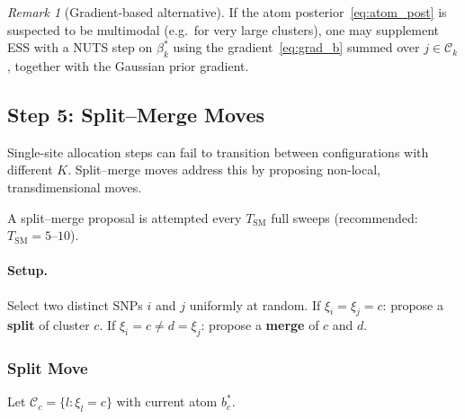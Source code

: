 \documentclass[12pt, a4paper]{article}
\theoremstyle{remark}
\newtheorem{remark}{Remark}
\begin{document}
\begin{remark}[Gradient-based alternative]
If the atom posterior~\eqref{eq:atom_post} is suspected to be
multimodal (e.g.\ for very large clusters), one may supplement ESS
with a NUTS step on $\beta_k^*$ using the gradient~\eqref{eq:grad_b}
summed over $j\in\mathcal{C}_k$, together with the Gaussian prior
gradient.
\end{remark}

\subsection{Step 5: Split--Merge Moves}
\label{sec:split_merge}

Single-site allocation steps can fail to transition between
configurations with different $K$.  Split--merge moves
\cite{Jain2004,Jain2007} address this by proposing non-local,
transdimensional moves.

A split--merge proposal is attempted every $T_{\mathrm{SM}}$ full
sweeps (recommended: $T_{\mathrm{SM}} = 5$--$10$).

\paragraph{Setup.}
Select two distinct SNPs $i$ and $j$ uniformly at random.
If $\xi_i = \xi_j = c$: propose a \textbf{split} of cluster $c$.
If $\xi_i = c \neq d = \xi_j$: propose a \textbf{merge} of $c$ and $d$.

\subsubsection{Split Move}

Let $\mathcal{C}_c = \{l:\xi_l = c\}$ with current atom $b_c^*$.
\end{document}
